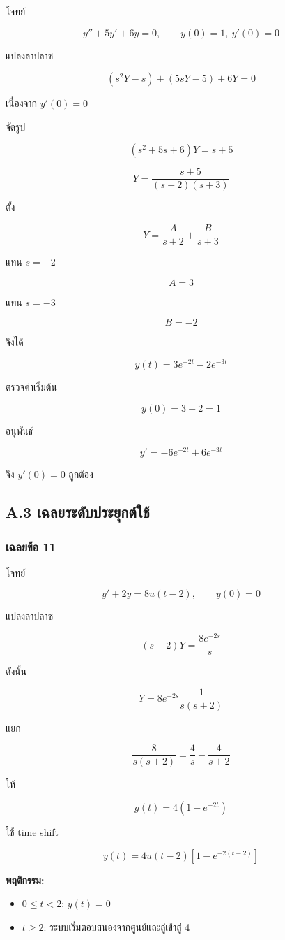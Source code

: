 โจทย์

\[
y''+5y'+6y=0,\qquad y(0)=1,\ y'(0)=0
\]

แปลงลาปลาซ

\[
(s^2Y-s)+(5sY-5)+6Y=0
\]

เนื่องจาก $y'(0)=0$

จัดรูป

\[
(s^2+5s+6)Y=s+5
\]

\[
Y=\frac{s+5}{(s+2)(s+3)}
\]

ตั้ง

\[
Y=\frac{A}{s+2}+\frac{B}{s+3}
\]

แทน $s=-2$

\[
A=3
\]

แทน $s=-3$

\[
B=-2
\]

จึงได้

\[
\boxed{y(t)=3e^{-2t}-2e^{-3t}}
\]

ตรวจค่าเริ่มต้น

\[
y(0)=3-2=1
\]

อนุพันธ์

\[
y'=-6e^{-2t}+6e^{-3t}
\]

จึง $y'(0)=0$ ถูกต้อง



\subsection{A.3 เฉลยระดับประยุกต์ใช้}

\subsubsection{เฉลยข้อ 11}

โจทย์

\[
y'+2y=8u(t-2),\qquad y(0)=0
\]

แปลงลาปลาซ

\[
(s+2)Y=\frac{8e^{-2s}}{s}
\]

ดังนั้น

\[
Y=8e^{-2s}\frac{1}{s(s+2)}
\]

แยก

\[
\frac{8}{s(s+2)}=\frac{4}{s}-\frac{4}{s+2}
\]

ให้

\[
g(t)=4(1-e^{-2t})
\]

ใช้ time shift

\[
\boxed{y(t)=4u(t-2)\left[1-e^{-2(t-2)}\right]}
\]

\textbf{พฤติกรรม:}

\begin{itemize}
    \item $0\le t<2$: $y(t)=0$
    \item $t\ge2$: ระบบเริ่มตอบสนองจากศูนย์และลู่เข้าสู่ 4
\end{itemize}

